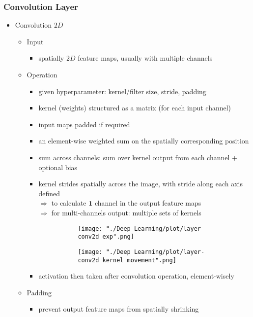 \subsubsection{Convolution Layer}
\begin{itemize}
\item Convolution $2D$
	\begin{itemize}
	\item Input
		\begin{itemize}
		\item spatially $2D$ feature maps, usually with multiple channels
		\end{itemize}
	\item Operation
		\begin{itemize}
		\item given hyperparameter: kernel/filter size, stride, padding
		\item kernel (weights) structured as a matrix (for each input channel)
		\item input maps padded if required
		\item an element-wise weighted sum on the spatially corresponding position
		\item sum across channels: sum over kernel output from each channel $+$ optional bias
		\item kernel strides spatially across the image, with stride along each axis defined \\
		$\Rightarrow$ to calculate $\mathbf 1$ channel in the output feature maps \\
		$\Rightarrow$ for multi-channels output: multiple sets of kernels
		\begin{figure}[ht]
		\centering
		\begin{subfigure}{.7\linewidth}
		\texttt{[image: "./Deep Learning/plot/layer-conv2d exp".png]}
		\end{subfigure}%
		\begin{subfigure}{.3\linewidth}
		\texttt{[image: "./Deep Learning/plot/layer-conv2d kernel movement".png]}
		\end{subfigure}%
		\end{figure}
		\item activation then taken after convolution operation, element-wisely
		\end{itemize}
	\item Padding
		\begin{itemize}
		\item prevent output feature maps from spatially shrinking

\end{itemize}
\end{itemize}
\end{itemize}
